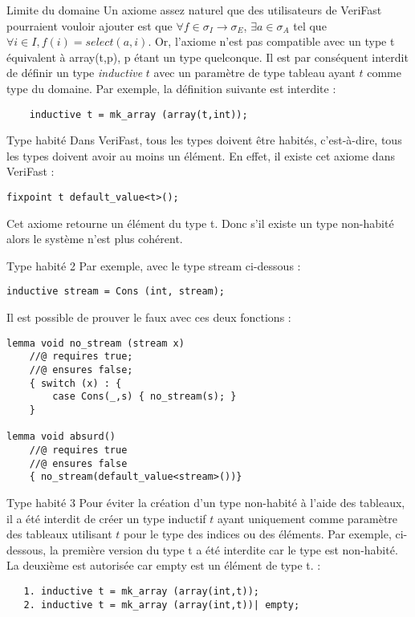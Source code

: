 \documentclass[9pt]{beamer}
\newcommand{\verifast}{VeriFast}
\begin{document}
\begin{frame}[fragile]{Limite du domaine}
Un axiome assez naturel que des utilisateurs de \verifast{} pourraient vouloir ajouter est que $\forall f\in \sigma_I \rightarrow \sigma_E$, $\exists a\in \sigma_A$ tel que $\forall i\in I, f(i) = select(a,i)$.
		Or, l'axiome n'est pas compatible avec un type t \'equivalent \`a array(t,p), p \'etant un type quelconque. Il est par cons\'equent interdit de d\'efinir un type \textit{inductive} $t$ avec un param\`etre de type tableau ayant $t$ comme type du domaine. Par exemple, la d\'efinition suivante est interdite :
			\begin{lstlisting}			
    inductive t = mk_array (array(t,int));
			\end{lstlisting}
\end{frame}

\begin{frame}[fragile]{Type habit\'e}
Dans \verifast{}, tous les types doivent \^etre habit\'es, c'est-\`a-dire, tous les types doivent avoir au moins un \'el\'ement. En effet, il existe cet axiome dans \verifast{} :
		\begin{lstlisting}
fixpoint t default_value<t>();
		\end{lstlisting}
		Cet axiome retourne un \'el\'ement du type t. Donc s'il existe un type non-habit\'e alors le syst\`eme n'est plus coh\'erent.
		
\end{frame}

\begin{frame}[fragile]{Type habit\'e 2}
  Par exemple, avec le type stream ci-dessous :
\begin{lstlisting}
inductive stream = Cons (int, stream);
\end{lstlisting}
Il est possible de prouver le faux avec ces deux fonctions :
\begin{lstlisting}[basicstyle=\footnotesize]
lemma void no_stream (stream x)
	//@ requires true;
	//@ ensures false;
	{ switch (x) : {
		case Cons(_,s) { no_stream(s); }
	}

lemma void absurd()
	//@ requires true
	//@ ensures false
	{ no_stream(default_value<stream>())}

		\end{lstlisting}
		
\end{frame}

\begin{frame}[fragile]{Type habit\'e 3}
Pour \'eviter la cr\'eation d'un type non-habit\'e \`a l'aide des tableaux, il a \'et\'e interdit de cr\'eer un type inductif $t$ ayant uniquement comme param\`etre des tableaux utilisant $t$ pour le type des indices ou des \'el\'ements. Par exemple, ci-dessous, la premi\`ere version du type t a \'et\'e interdite car le type est non-habit\'e. La deuxi\`eme est autoris\'ee car empty est un \'el\'ement de type t. :
				\begin{lstlisting}			
   1. inductive t = mk_array (array(int,t));
   2. inductive t = mk_array (array(int,t))| empty;
				\end{lstlisting}
\end{frame}
\end{document}
